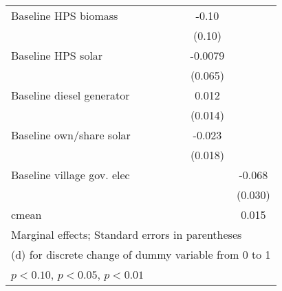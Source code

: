 \begin{table}[htbp]
\begin{tabular*}{1\hsize}{@{\hskip\tabcolsep\extracolsep\fill}l*{6}{c}}
Baseline HPS biomass&                  &                  &                  &                  &    -0.10         &                  \\
                &                  &                  &                  &                  &   (0.10)         &                  \\
Baseline HPS solar&                  &                  &                  &                  &  -0.0079         &                  \\
                &                  &                  &                  &                  &  (0.065)         &                  \\
Baseline diesel generator&                  &                  &                  &                  &    0.012         &                  \\
                &                  &                  &                  &                  &  (0.014)         &                  \\
Baseline own/share solar&                  &                  &                  &                  &   -0.023         &                  \\
                &                  &                  &                  &                  &  (0.018)         &                  \\
Baseline village gov. elec&                  &                  &                  &                  &                  &   -0.068\sym{**} \\
                &                  &                  &                  &                  &                  &  (0.030)         \\
\midrule
cmean           &                  &                  &                  &                  &                  &    0.015         \\
\bottomrule
\multicolumn{7}{l}{\footnotesize Marginal effects; Standard errors in parentheses}\\
\multicolumn{7}{l}{\footnotesize  (d) for discrete change of dummy variable from 0 to 1}\\
\multicolumn{7}{l}{\footnotesize \sym{*} \(p<0.10\), \sym{**} \(p<0.05\), \sym{***} \(p<0.01\)}\\
\end{tabular*}
\end{table}
